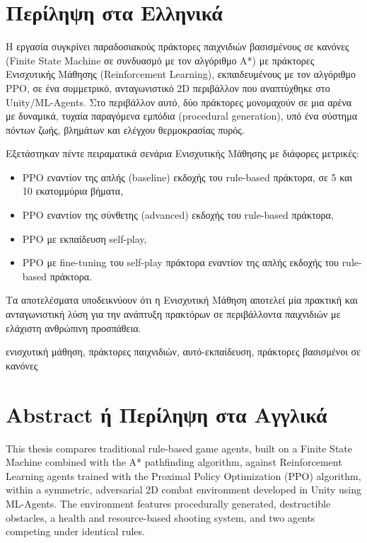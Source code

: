 \section*{Περίληψη στα Ελληνικά}
Η εργασία συγκρίνει παραδοσιακούς πράκτορες παιχνιδιών βασισμένους σε κανόνες
(Finite State Machine σε συνδυασμό με τον αλγόριθμο A*) με πράκτορες Ενισχυτικής
Μάθησης (Reinforcement Learning), εκπαιδευμένους με τον αλγόριθμο PPO, σε ένα
συμμετρικό, ανταγωνιστικό 2D περιβάλλον που αναπτύχθηκε στο Unity/ML-Agents.
Στο περιβάλλον αυτό, δύο πράκτορες μονομαχούν σε μια αρένα με δυναμικά,
τυχαία παραγόμενα εμπόδια (procedural generation), υπό ένα σύστημα πόντων ζωής,
βλημάτων και ελέγχου θερμοκρασίας πυρός.

Εξετάστηκαν πέντε πειραματικά σενάρια Ενισχυτικής Μάθησης με διάφορες μετρικές:
\begin{itemize}
	\item PPO εναντίον της απλής (baseline) εκδοχής του rule-based πράκτορα, σε 5 και 10 εκατομμύρια βήματα,
	\item PPO εναντίον της σύνθετης (advanced) εκδοχής του rule-based πράκτορα,
	\item PPO με εκπαίδευση self-play,
	\item PPO με fine-tuning του self-play πράκτορα εναντίον της απλής εκδοχής του rule-based πράκτορα.
\end{itemize}

Τα αποτελέσματα υποδεικνύουν ότι η Ενισχυτική Μάθηση αποτελεί μία πρακτική και ανταγωνιστική λύση για την ανάπτυξη πρακτόρων σε περιβάλλοντα παιχνιδιών με ελάχιστη ανθρώπινη προσπάθεια.

\vspace{5cm}
 ενισχυτική μάθηση, πράκτορες παιχνιδιών, αυτό-εκπαίδευση, πράκτορες βασισμένοι σε κανόνες

\pagebreak
\section*{Abstract ή Περίληψη στα Αγγλικά}

This thesis compares traditional rule-based game agents, built on a Finite
State Machine combined with the A* pathfinding algorithm, against
Reinforcement Learning agents trained with the Proximal Policy Optimization
(PPO) algorithm, within a symmetric, adversarial 2D combat environment
developed in Unity using ML-Agents. The environment features procedurally
generated, destructible obstacles, a health and resource-based shooting system,
and two agents competing under identical rules.

